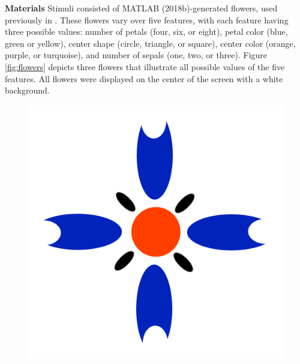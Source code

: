 \documentclass[twocolumn]{svjour3}          %
\begin{document}
\noindent\textbf{Materials }
Stimuli consisted of MATLAB (2018b)-generated flowers, used previously
in \citet{DeBrigard2017}. These flowers vary over five features, with
each feature having three possible values: number of petals (four,
six, or eight), petal color (blue, green or yellow), center shape
(circle, triangle, or square), center color (orange, purple, or
turquoise), and number of sepals (one, two, or three). Figure
\ref{fig:flowers} depicts three flowers that illustrate all
possible values of the five features. All flowers were displayed on
the center of the screen with a white background.

\begin{figure}
  \includegraphics[scale=0.15]{flower1.png}

\end{figure}
\end{document}
